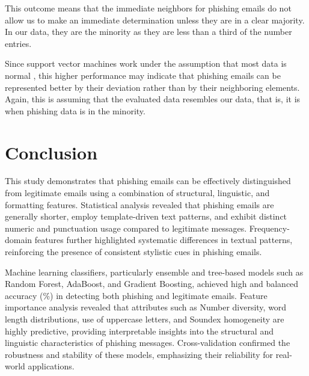 \documentclass[article,pdftex,10pt,a4paper,twocolumn]{article}
\begin{document}
This outcome means that the immediate neighbors for phishing emails do not allow us to make an immediate determination unless they are in a clear majority. In our data, they are the minority as they are less than a third of the number entries.

Since support vector machines work under the assumption that most data is normal \citep{bhakta}, this higher performance may indicate that phishing emails can be represented better by their deviation rather than by their neighboring elements. Again, this is assuming that the evaluated data resembles our data, that is, it is when phishing data is in the minority.

\section{Conclusion}
\label{conclusion}




This study demonstrates that phishing emails can be effectively distinguished from legitimate emails using a combination of structural, linguistic, and formatting features. Statistical analysis revealed that phishing emails are generally shorter, employ template-driven text patterns, and exhibit distinct numeric and punctuation usage compared to legitimate messages. Frequency-domain features further highlighted systematic differences in textual patterns, reinforcing the presence of consistent stylistic cues in phishing emails.

Machine learning classifiers, particularly ensemble and tree-based models such as Random Forest, AdaBoost, and Gradient Boosting, achieved high and balanced accuracy (\%) in detecting both phishing and legitimate emails. Feature importance analysis revealed that attributes such as Number diversity, word length distributions, use of uppercase letters, and Soundex homogeneity are highly predictive, providing interpretable insights into the structural and linguistic characteristics of phishing messages. Cross-validation confirmed the robustness and stability of these models, emphasizing their reliability for real-world applications.
\end{document}
